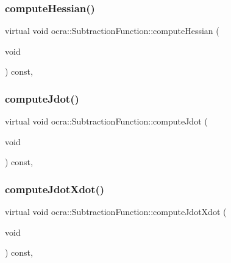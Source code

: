 \hypertarget{classocra_1_1SubtractionFunction_ac6558a3de7573facbc7a4d1b03128e43}{}\label{classocra_1_1SubtractionFunction_ac6558a3de7573facbc7a4d1b03128e43} 
\subsubsection{\texorpdfstring{compute\+Hessian()}{computeHessian()}}
{\footnotesize\ttfamily virtual void ocra\+::\+Subtraction\+Function\+::compute\+Hessian (\begin{DoxyParamCaption}\item[{void}]{ }\end{DoxyParamCaption}) const\hspace{0.3cm}{\ttfamily [protected]}, {\ttfamily [virtual]}}

\hypertarget{classocra_1_1SubtractionFunction_a2bbae38f5ddcfacb9bc5f4114ffb7b02}{}\label{classocra_1_1SubtractionFunction_a2bbae38f5ddcfacb9bc5f4114ffb7b02} 
\subsubsection{\texorpdfstring{compute\+Jdot()}{computeJdot()}}
{\footnotesize\ttfamily virtual void ocra\+::\+Subtraction\+Function\+::compute\+Jdot (\begin{DoxyParamCaption}\item[{void}]{ }\end{DoxyParamCaption}) const\hspace{0.3cm}{\ttfamily [protected]}, {\ttfamily [virtual]}}

\hypertarget{classocra_1_1SubtractionFunction_aeca1fe085ed1302c87e7ed4ee80082ed}{}\label{classocra_1_1SubtractionFunction_aeca1fe085ed1302c87e7ed4ee80082ed} 
\subsubsection{\texorpdfstring{compute\+Jdot\+Xdot()}{computeJdotXdot()}}
{\footnotesize\ttfamily virtual void ocra\+::\+Subtraction\+Function\+::compute\+Jdot\+Xdot (\begin{DoxyParamCaption}\item[{void}]{ }\end{DoxyParamCaption}) const\hspace{0.3cm}{\ttfamily [protected]}, {\ttfamily [virtual]}}

